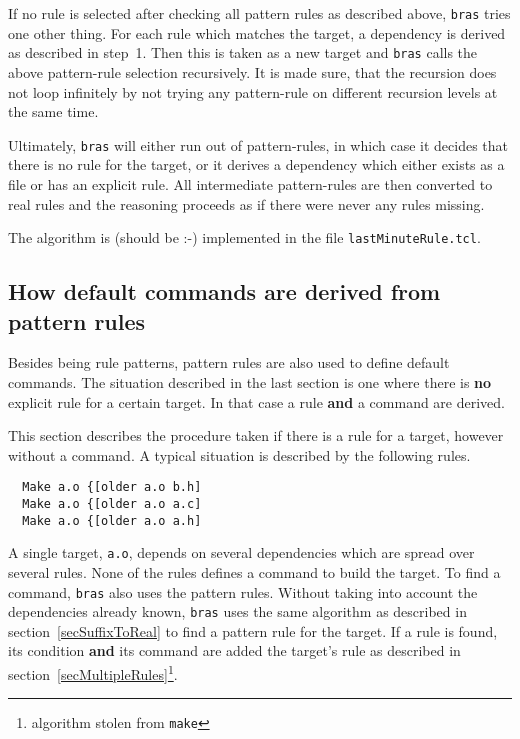 \documentclass[11pt,bibtotoc,idxtotoc]{scrreprt}
\makeatletter
\newcommand{\bras}{\texttt{bras}}
\newcommand{\make}{\texttt{make}}
\newcommand{\Indextt}[1]{\texttt{#1}\index{#1@\texttt{#1}}}
\makeatother
\begin{document}
If no rule is selected after checking all pattern rules as described
above, \bras{} tries one other thing. For each rule which matches the
target, a dependency is derived as described in step~1. Then this is
taken as a new target and \bras{} calls the above pattern-rule
selection recursively. It is made sure, that the recursion does not
loop infinitely by not trying any pattern-rule on different recursion
levels at the same time.

Ultimately, \bras{} will either run out of pattern-rules, in which
case it decides that there is no rule for the target, or it derives a
dependency which either exists as a file or has an explicit rule. All
intermediate pattern-rules are then converted to real rules and the
reasoning proceeds as if there were never any rules missing.

The algorithm is (should be :-) implemented in the file
\Indextt{lastMinuteRule.tcl}.

\subsection{How default commands are derived from pattern rules}
\label{secSuffixAsDefCmd}
Besides being rule patterns, pattern rules are also used to define
default commands. The situation described in the last section is one
where there is \textbf{no} explicit rule for a certain target. In that
case a rule \textbf{and} a command are derived.

This section describes the procedure taken if there is a rule for a
target, however without a command. A typical situation is described by
the following rules.

\begin{verbatim}
  Make a.o {[older a.o b.h]
  Make a.o {[older a.o a.c]
  Make a.o {[older a.o a.h]
\end{verbatim}

A single target, \texttt{a.o}, depends on several dependencies which
are spread over several rules. None of the rules defines a command to
build the target. To find a command, \bras{} also uses the pattern
rules. Without taking into account the dependencies already known,
\bras{} uses the same algorithm as described in
section~\ref{secSuffixToReal} to find a pattern rule for the target.
If a rule is found, its condition \textbf{and} its command are added
the target's rule as described in
section~\ref{secMultipleRules}\footnote{algorithm stolen from \make{}}.
\end{document}
